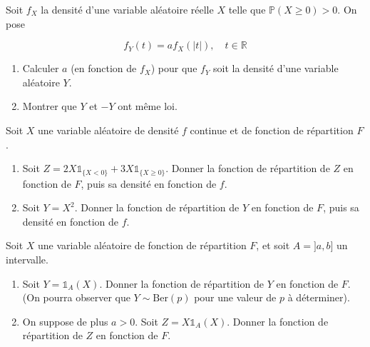 \medskip

\begin{mdframed}
\begin{exercice}
Soit $f_X$ la densité d'une variable aléatoire réelle $X$ telle que $\mathbb{P}(X \geq 0) > 0$. On pose 

$$
f_Y(t) = af_X(|t|), \quad t \in \mathbb{R}
$$

\begin{enumerate}
\item Calculer $a$ (en fonction de $f_X$) pour que $f_Y$ soit la densité d'une variable aléatoire $Y$. 
\item Montrer que $Y$ et $-Y$ ont même loi.
\end{enumerate}
\end{exercice}
\end{mdframed}

\medskip

\begin{mdframed}
\begin{exercice}
Soit $X$ une variable aléatoire de densité $f$ continue et de fonction de répartition $F$. 

\begin{enumerate}
\item Soit $Z = 2X\mathbb{1}_{\{X<0\}} + 3X\mathbb{1}_{\{X \geq 0\}}$. Donner la fonction de répartition de $Z$ en fonction de $F$, puis sa densité en fonction de $f$. 
\item Soit $Y = X^2$. Donner la fonction de répartition de $Y$ en fonction de $F$, puis sa densité en fonction de $f$.
\end{enumerate}
\end{exercice}
\end{mdframed}

\medskip

\begin{mdframed}
\begin{exercice}
Soit $X$ une variable aléatoire de fonction de répartition $F$, et soit $A = ]a, b]$ un intervalle. 

\begin{enumerate}
\item Soit $Y = \mathbb{1}_A(X)$. Donner la fonction de répartition de $Y$ en fonction de $F$. (On pourra observer que $Y \sim \text{Ber}(p)$ pour une valeur de $p$ à déterminer). 
\item On suppose de plus $a > 0$. Soit $Z = X\mathbb{1}_A(X)$. Donner la fonction de répartition de $Z$ en fonction de $F$.
\end{enumerate}
\end{exercice}
\end{mdframed}

